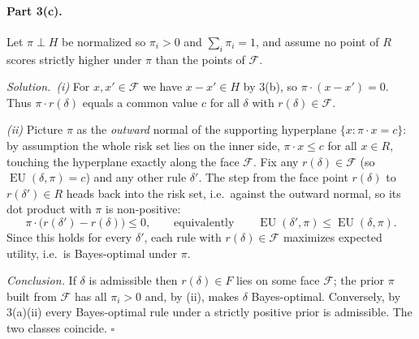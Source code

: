 \documentclass[11pt]{article}
\newcommand{\rd}{r(\delta)}
\DeclareMathOperator{\EU}{EU}
\newcommand{\soln}{\medskip\noindent\textit{Solution.}\ }
\renewcommand{\qed}{\ensuremath{\square}}
\begin{document}
\begin{solution}
\paragraph{Part 3(c).} Let $\pi\perp H$ be normalized so $\pi_i>0$ and $\sum_i\pi_i=1$, and assume no point of $R$ scores strictly higher under $\pi$ than the points of $\mathcal F$.

\soln \emph{(i)} For $x,x'\in\mathcal F$ we have $x-x'\in H$ by 3(b), so $\pi\cdot(x-x')=0$. Thus $\pi\cdot\rd$ equals a common value $c$ for all $\delta$ with $\rd\in\mathcal F$.

\emph{(ii)} Picture $\pi$ as the \emph{outward} normal of the supporting hyperplane $\{x:\pi\cdot x=c\}$: by assumption the whole risk set lies on the inner side, $\pi\cdot x\le c$ for all $x\in R$, touching the hyperplane exactly along the face $\mathcal F$. Fix any $\rd\in\mathcal F$ (so $\EU(\delta,\pi)=c$) and any other rule $\delta'$. The step from the face point $\rd$ to $r(\delta')\in R$ heads back into the risk set, i.e.\ against the outward normal, so its dot product with $\pi$ is non-positive:
\[
  \pi\cdot\big(r(\delta')-\rd\big)\le 0,\qquad\text{equivalently}\qquad \EU(\delta',\pi)\le\EU(\delta,\pi).
\]
Since this holds for every $\delta'$, each rule with $\rd\in\mathcal F$ maximizes expected utility, i.e.\ is Bayes-optimal under $\pi$.

\emph{Conclusion.} If $\delta$ is admissible then $\rd\in F$ lies on some face $\mathcal F$; the prior $\pi$ built from $\mathcal F$ has all $\pi_i>0$ and, by (ii), makes $\delta$ Bayes-optimal. Conversely, by 3(a)(ii) every Bayes-optimal rule under a strictly positive prior is admissible. The two classes coincide. \qed
\end{solution}
\end{document}

